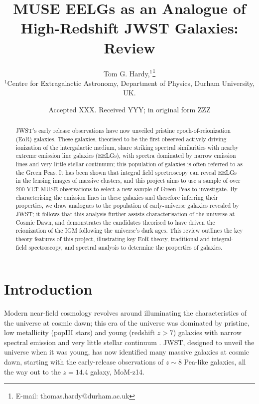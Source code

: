 \documentclass[fleqn,usenatbib]{mnras}
\title[Short title, max. 45 characters]{MUSE EELGs as an Analogue of High-Redshift JWST Galaxies: Review}
\author[Tom G. Hardy]{
Tom G. Hardy,$^{1}$\thanks{E-mail: thomas.hardy@durham.ac.uk}
\\
$^{1}$Centre for Extragalactic Astronomy, Department of Physics, Durham University, UK.
}
\date{Accepted XXX. Received YYY; in original form ZZZ}
\begin{document}
\label{firstpage}
\pagerange{\pageref{firstpage}--\pageref{lastpage}}
\maketitle

\begin{abstract}
JWST’s early release observations have now unveiled pristine epoch-of-reionization (EoR) galaxies. These galaxies, theorised to be the first observed actively driving ionization of the intergalactic medium, share striking spectral similarities with nearby extreme emission line galaxies (EELGs), with spectra dominated by narrow emission lines and very little stellar continuum; this population of galaxies is often referred to as the Green Peas. It has been shown that integral field spectroscopy can reveal EELGs in the lensing images of massive clusters, and this project aims to use a sample of over 200 VLT-MUSE observations to select a new sample of Green Peas to investigate. By characterising the emission lines in these galaxies and therefore inferring their properties, we draw analogues to the population of early-universe galaxies revealed by JWST; it follows that this analysis further assists characterisation of the universe at Cosmic Dawn, and demonstrates the candidates theorised to have driven the reionization of the IGM following the universe’s dark ages. This review outlines the key theory features of this project, illustrating key EoR theory, traditional and integral-field spectroscopy, and spectral analysis to determine the properties of galaxies.
\end{abstract}

\begin{keywords}
\end{keywords}



\section{Introduction}

Modern near-field cosmology revolves around illuminating the characteristics of the universe at cosmic dawn; this era of the universe was dominated by pristine, low metallicity (popIII stars) and young (redshift $z>7$) galaxies with narrow spectral emission and very little stellar continuum \citep{klessen, zaroubi}. JWST, designed to unveil the universe when it was young, has now identified many massive galaxies at cosmic dawn, starting with the \cite{Rhoads} early-release observations of $z\sim8$ Pea-like galaxies, all the way out to the \cite{Naidu} $z=14.4$ galaxy, MoM-z14.
\end{document}
